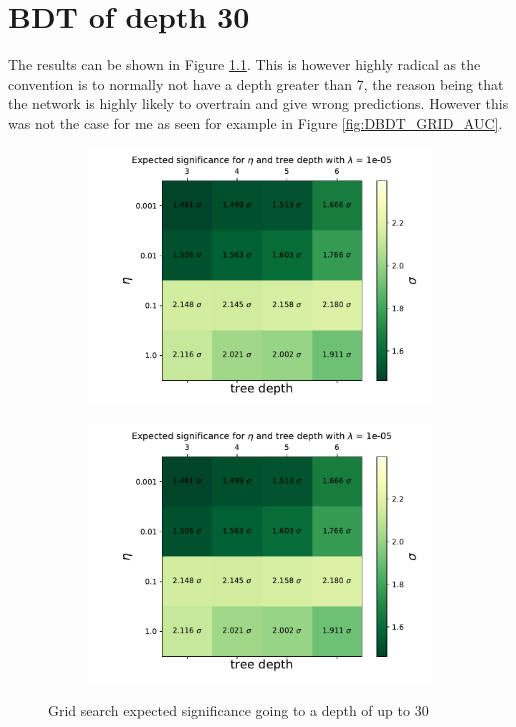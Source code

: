\documentclass[12pt, a4paper]{book}
\begin{document}
\chapter{BDT of depth 30}\label{apendix:BDT_depth_30}
The results can be shown in Figure \ref{fig:BDT_deep_sig}. This is however highly radical as the convention is to normally not have a depth greater than 7, 
the reason being that the network is highly likely to overtrain and give wrong predictions. However this was not the case for me as seen for example in Figure \ref{fig:DBDT_GRID_AUC}.
\graphicspath{{../../Plots/XGBoost/FULL/GRIDSEARCH_3-6}}
\begin{figure}[!ht]
	\centering
	\begin{subfigure}[b]{0.49\textwidth}
      \centering
      \includegraphics[width=1\textwidth]{Expected_significance.pdf}
   \end{subfigure}
   \hfill\graphicspath{{../../Plots/XGBoost/FULL/GRIDSEARCH_24-30}}
   \begin{subfigure}[b]{0.49\textwidth}
      \centering
      \includegraphics[width=1\textwidth]{Expected_significance.pdf}
   \end{subfigure}
   \caption{Grid search expected significance going to a depth of up to 30}\label{fig:BDT_deep_sig}
\end{figure}
\end{document}
